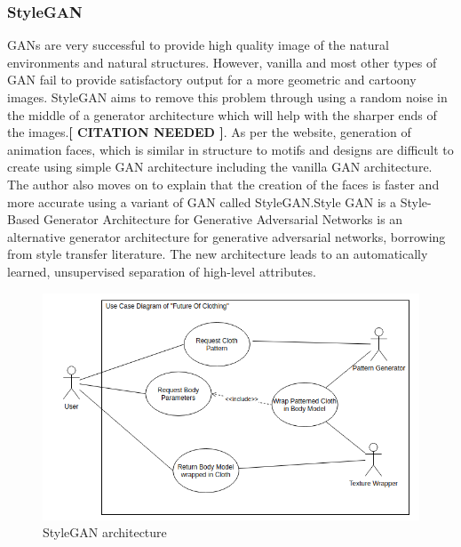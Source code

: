 \documentclass{article}
\begin{document}
\subsubsection{StyleGAN}
GANs are very successful to provide high quality image of the natural environments and natural structures. However, vanilla and most other types of GAN fail to provide satisfactory output for a more geometric and cartoony images. StyleGAN aims to remove this problem through using a random noise in the middle of a generator architecture which will help with the sharper ends of the images.\textbf{[ CITATION NEEDED ]}. As per the website, generation of animation faces, which is similar in structure to motifs and designs are difficult to create using simple GAN architecture including the vanilla GAN architecture. The author also moves on to explain that the creation of the faces is faster and more accurate using a variant of GAN called StyleGAN.Style GAN is a Style-Based Generator Architecture for Generative Adversarial Networks is an alternative generator architecture for generative adversarial networks, borrowing from style transfer literature. The new architecture leads to an automatically learned, unsupervised separation of high-level attributes.
\begin{figure}[h]
    \includegraphics[scale=0.5]{images/softwareDiagrams/FinalSystemUseCase.png}
    \centering
    \caption{StyleGAN architecture}    
\end{figure}
\end{document}
